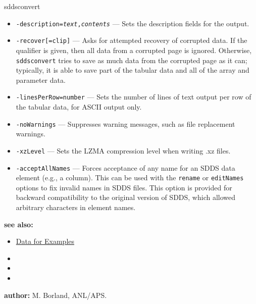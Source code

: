 \begin{sddsprog}{sddsconvert}
\begin{itemize}
    \item {\tt -description=\emph{text},\emph{contents}} --- Sets the description fields for the output.
    \item {\tt -recover[=clip]} --- Asks for attempted recovery of corrupted data. If the qualifier is given, then all data from a corrupted page is ignored. Otherwise, \verb|sddsconvert| tries to save as much data from the corrupted page as it can; typically, it is able to save part of the tabular data and all of the array and parameter data.
    \item {\tt -linesPerRow=\rm number} --- Sets the number of lines of text output per row of the tabular data, for ASCII output only.
    \item {\tt -noWarnings} --- Suppresses warning messages, such as file replacement warnings.
    \item {\tt -xzLevel} --- Sets the LZMA compression level when writing .xz files.
    \item {\tt -acceptAllNames} --- Forces acceptance of any name for an SDDS data element (e.g., a column). This can be used with the \verb|rename| or \verb|editNames| options to fix invalid names in SDDS files. This option is provided for backward compatibility to the original version of SDDS, which allowed arbitrary characters in element names.
    \end{itemize}

  \item \textbf{see also:}
    \begin{itemize}
    \item \hyperref[exampleData]{Data for Examples}
    \item {}
    \item {}
    \item {}
    \end{itemize}

  \item \textbf{author:} M. Borland, ANL/APS.
\end{sddsprog}
